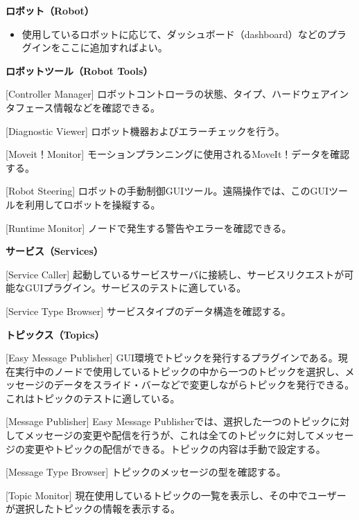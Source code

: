 \textbf{ロボット（Robot）}
\begin{itemize}
\item 使用しているロボットに応じて、ダッシュボード（dashboard）などのプラグインをここに追加すればよい。\\
\end{itemize}

\textbf{ロボットツール（Robot Tools）}
\begin{description}
\item  {[Controller Manager]} ロボットコントローラの状態、タイプ、ハードウェアインタフェース情報などを確認できる。
\item  {[Diagnostic Viewer]} ロボット機器およびエラーチェックを行う。
\item  {[Moveit！Monitor]} モーションプランニングに使用されるMoveIt！データを確認する。
\item  {[Robot Steering]} ロボットの手動制御GUIツール。遠隔操作では、このGUIツールを利用してロボットを操縦する。
\item  {[Runtime Monitor]} ノードで発生する警告やエラーを確認できる。\\
\end{description}

\textbf{サービス（Services）}
\begin{description}
\item  {[Service Caller]} 起動しているサービスサーバに接続し、サービスリクエストが可能なGUIプラグイン。サービスのテストに適している。
\item  {[Service Type Browser]} サービスタイプのデータ構造を確認する。\\
\end{description}

\textbf{トピックス（Topics）}
\begin{description}
\item  {[Easy Message Publisher]} GUI環境でトピックを発行するプラグインである。現在実行中のノードで使用しているトピックの中から一つのトピックを選択し、メッセージのデータをスライド・バーなどで変更しながらトピックを発行できる。これはトピックのテストに適している。
\item  {[Message Publisher]} Easy Message Publisherでは、選択した一つのトピックに対してメッセージの変更や配信を行うが、これは全てのトピックに対してメッセージの変更やトピックの配信ができる。トピックの内容は手動で設定する。
\item  {[Message Type Browser]} トピックのメッセージの型を確認する。
\item  {[Topic Monitor]} 現在使用しているトピックの一覧を表示し、その中でユーザーが選択したトピックの情報を表示する。\\
\end{description}

